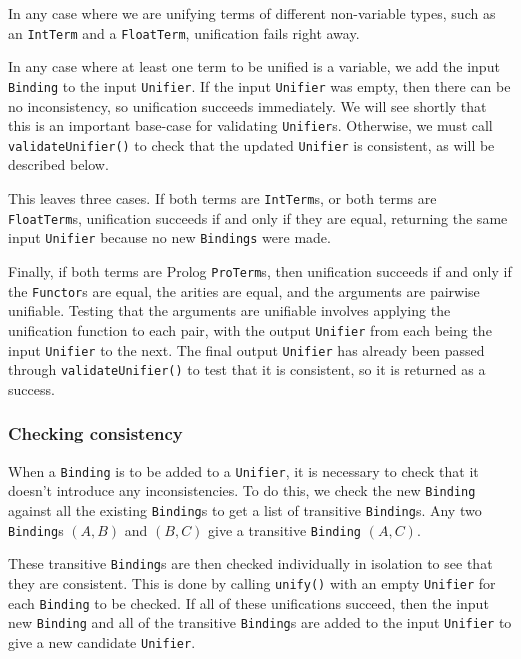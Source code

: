 \documentclass[12pt]{article}
\begin{document}
In any case where we are unifying terms of different non-variable types, such as an \verb|IntTerm| and a \verb|FloatTerm|, unification fails right away. 

In any case where at least one term to be unified is a variable, we add the input \verb|Binding| to the input \verb|Unifier|. 
If the input \verb|Unifier| was empty, then there can be no inconsistency, so unification succeeds immediately. 
We will see shortly that this is an important base-case for validating \verb|Unifier|s. 
Otherwise, we must call \verb|validateUnifier()| to check that the updated \verb|Unifier| is consistent, as will be described below.

This leaves three cases. 
If both terms are \verb|IntTerm|s, or both terms are \verb|FloatTerm|s, unification succeeds if and only if they are equal, returning the same input \verb|Unifier| because no new \verb|Bindings| were made. 

Finally, if both terms are Prolog \verb|ProTerm|s, then unification succeeds if and only if the \verb|Functor|s are equal, the arities are equal, and the arguments are pairwise unifiable. 
Testing that the arguments are unifiable involves applying the unification function to each pair, with the output \verb|Unifier| from each being the input \verb|Unifier| to the next. 
The final output \verb|Unifier| has already been passed through \verb|validateUnifier()| to test that it is consistent, so it is returned as a success.

\subsubsection{Checking consistency}


When a \verb|Binding| is to be added to a \verb|Unifier|, it is necessary to check that it doesn't introduce any inconsistencies. 
To do this, we check the new \verb|Binding| against all the existing \verb|Binding|s to get a list of transitive \verb|Binding|s. 
Any two \verb|Binding|s $(A,B)$ and $(B,C)$ give a transitive \verb|Binding| $(A,C)$.

These transitive \verb|Binding|s are then checked individually in isolation to see that they are consistent. 
This is done by calling \verb|unify()| with an empty \verb|Unifier| for each \verb|Binding| to be checked. 
If all of these unifications succeed, then the input new \verb|Binding| and all of the transitive \verb|Binding|s are added to the input \verb|Unifier| to give a new candidate \verb|Unifier|.
\end{document}
